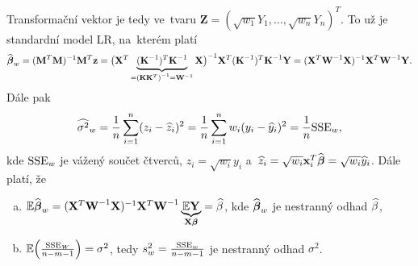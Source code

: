 Transformační vektor je tedy ve~tvaru $\textbf{Z} = (\sqrt{w_1}Y_1,...,\sqrt{w_n}Y_n)^T$. To už je standardní model LR, na~kterém platí
 $$ \widehat{\boldsymbol{\beta}}_w = {(\textbf{M}^T\textbf{M})^{-1}}\textbf{M}^T\textbf{z} = {\big(\mathbf{X}^T\underbrace{(\textbf{K}^{-1})^T {\textbf{K}^{-1}}}_{ = {{(\textbf{K}\textbf{K}^T)}^{-1}} = {\textbf{W}^{-1}}}\mathbf{X}\big)^{-1}}\mathbf{X}^T({\textbf{K}^{-1}})^T{\textbf{K}^{-1}}\mathbf{Y} = {(\mathbf{X}^T{\textbf{W}^{-1}}\mathbf{X})^{-1}}\mathbf{X}^T{\textbf{W}^{-1}}\mathbf{Y}. $$
Dále pak
 $$ \widehat{{\sigma}^2}_w = \frac{1}{n}\sum\limits_{i=1}^{n} (z_i-\widehat{z}_i)^2 = \frac{1}{n}\sum\limits_{i=1}^{n} w_i(y_i-\widehat{y}_i)^2 = \frac{1}{n}\mathrm{SSE}_w, $$ kde $\mathrm{SSE}_w$ je vážený součet čtverců, $z_i = \sqrt{w_i}y_i$ a~$\widehat{z}_i = \sqrt{w_i}\mathbf{x}_i^T\widehat{\boldsymbol{\beta}} = \sqrt{w_i}\widehat{y}_i$.
Dále platí, že
\begin{enumerate}[a)]
	\item $\mathbb{E}\widehat{\boldsymbol{\beta}}_w = {(\mathbf{X}^T{\textbf{W}^{-1}}\mathbf{X})^{-1}}\mathbf{X}^T{\textbf{W}^{-1}}\underbrace{\mathbb{E} \mathbf{Y}}_{\mathbf{X}\boldsymbol{\beta}} = \widehat{\beta}$, kde $\widehat{\boldsymbol{\beta}}_w$ je nestranný odhad $\widehat{\beta}$,
	\item $\mathbb{E}\Big(\frac{\mathrm{SSE}_W}{n-m-1}\Big) = \sigma^2$, tedy $s_w^2 = \frac{\mathrm{SSE}_w}{n-m-1}$ je nestranný odhad $\sigma^2$.
\end{enumerate}

